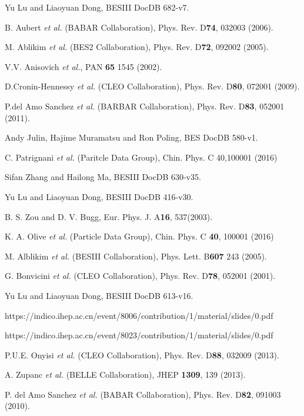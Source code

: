 \newpage
\begin{thebibliography}{99}

Yu Lu and Liaoyuan Dong, 
BESIII DocDB 682-v7.

B. Aubert {\it et al.}  (BABAR Collaboration),
Phys. Rev. D\textbf{74}, 032003 (2006).

M. Ablikim {\it et al.}  (BES2 Collaboration),
Phys. Rev. D\textbf{72}, 092002 (2005).

V.V. Anisovich {\it et al.},
PAN \textbf{65} 1545 (2002).

D.Cronin-Hennessy {\it et al.}  (CLEO Collaboration),
Phys. Rev. D\textbf{80}, 072001 (2009).

P.del Amo Sanchez {\it et al.}  (BARBAR Collaboration),
Phys. Rev. D\textbf{83}, 052001 (2011).

Andy Julin, Hajime Muramatsu and Ron Poling,  
BES\uppercase\expandafter{} DocDB 580-v1.

C. Patrignani {\it et al.}  (Paritcle Data Group),
Chin. Phys. C 40,100001 (2016)

Sifan Zhang and Hailong Ma, 
BESIII DocDB 630-v35.

Yu Lu and Liaoyuan Dong, 
BESIII DocDB 416-v30.

B. S. Zou and D. V. Bugg, 
Eur. Phys. J. A\textbf{16}, 537(2003).

K. A. Olive {\it et al.} (Particle Data Group), 
Chin. Phys. C \textbf{40}, 100001 (2016)

M. Alblikim {\it et al.}  (BESIII Collaboration),
Phys. Lett. B\textbf{607} 243 (2005).

G. Bonvicini {\it et al.}  (CLEO Collaboration),
Phys. Rev. D\textbf{78}, 052001 (2001).

Yu Lu and Liaoyuan Dong, 
BESIII DocDB 613-v16.

https://indico.ihep.ac.cn/event/8006/contribution/1/material/slides/0.pdf

https://indico.ihep.ac.cn/event/8023/contribution/1/material/slides/0.pdf

P.U.E. Onyisi {\it et al.}  (CLEO Collaboration),
Phys. Rev. D\textbf{88}, 032009 (2013).

A. Zupanc {\it et al.}  (BELLE Collaboration),
JHEP \textbf{1309}, 139 (2013).

P. del Amo Sanchez {\it et al.}  (BABAR Collaboration),
Phys. Rev. D\textbf{82}, 091003 (2010).

\end{thebibliography}

